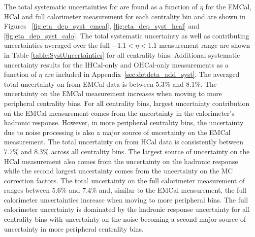The total systematic uncertainties for \detdeta are found as a function of $\eta$ for the EMCal, HCal and full calorimeter measurement for each centrality bin and are shown in Figures ~\ref{fig:eta_dep_syst_emcal}, \ref{fig:eta_dep_syst_hcal} and \ref{fig:eta_dep_syst_calo}. 
The total systematic uncertainty as well as contributing uncertainties averaged over the full $-1.1 < \eta < 1.1$ measurement range are shown in Table \ref{table:SystUncertainties} for all centrality bins.
Additional systematic uncertainty results for the IHCal-only and OHCal-only \detdeta measurements as a function of $\eta$ are included in Appendix~\ref{sec:detdeta_add_syst}.
The averaged total uncertainty on \detdeta from EMCal data is between 5.3\% and 8.1\%. The uncertainty on the EMCal \detdeta measurement increases when moving to more peripheral centrality bins. 
For all centrality bins, largest uncertainty contribution on the EMCal \detdeta measurement comes from the uncertainty in the calorimeter's hadronic response. 
However, in more peripheral centrality bins, the uncertainty due to noise processing is also a major source of uncertainty on the EMCal \detdeta measurement. 
The total uncertainty on \detdeta from HCal data is consistently between 7.7\% and 8.3\% across all centrality bins. 
The largest source of uncertainty on the HCal \detdeta measurement also comes from the uncertainty on the hadronic response while the second largest uncertainty comes from the uncertainty on the MC correction factors. 
The total uncertainty on the full calorimeter measurement of \detdeta ranges between 5.6\% and 7.4\% and, similar to the EMCal measurement, the full calorimeter uncertainties increase when moving to more peripheral bins. 
The full calorimeter uncertainty is dominated by the hadronic response uncertainty for all centrality bins with uncertainty on the noise becoming a second major source of uncertainty in more peripheral centrality bins.

